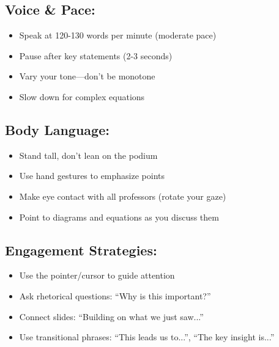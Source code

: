 \documentclass[12pt,a4paper]{article}
\begin{document}
\begin{tipbox}
\subsection*{Voice \& Pace:}
\begin{itemize}[leftmargin=*]
    \item Speak at 120-130 words per minute (moderate pace)
    \item Pause after key statements (2-3 seconds)
    \item Vary your tone---don't be monotone
    \item Slow down for complex equations
\end{itemize}
\end{tipbox}

\begin{tipbox}
\subsection*{Body Language:}
\begin{itemize}[leftmargin=*]
    \item Stand tall, don't lean on the podium
    \item Use hand gestures to emphasize points
    \item Make eye contact with all professors (rotate your gaze)
    \item Point to diagrams and equations as you discuss them
\end{itemize}
\end{tipbox}

\begin{tipbox}
\subsection*{Engagement Strategies:}
\begin{itemize}[leftmargin=*]
    \item Use the pointer/cursor to guide attention
    \item Ask rhetorical questions: ``Why is this important?''
    \item Connect slides: ``Building on what we just saw...''
    \item Use transitional phrases: ``This leads us to...'', ``The key insight is...''
\end{itemize}
\end{tipbox}
\end{document}
